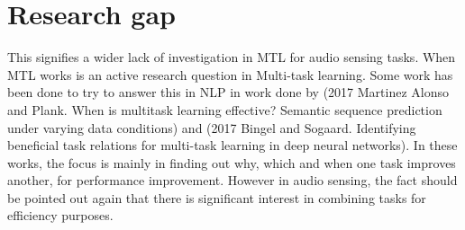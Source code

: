 	\section{Research gap}
	This signifies a wider lack of investigation in MTL for audio sensing tasks. When MTL works is an active research question in Multi-task learning. Some work has been done to try to answer this in NLP in work done by (2017 Martinez Alonso and Plank. When is multitask learning effective? Semantic sequence prediction under varying data conditions) and (2017 Bingel and Sogaard. Identifying beneficial task relations for multi-task learning in deep neural networks). In these works, the focus is mainly in finding out why, which and when one task improves another, for performance improvement. However in audio sensing, the fact should be pointed out again that there is significant interest in combining tasks for efficiency purposes.
	